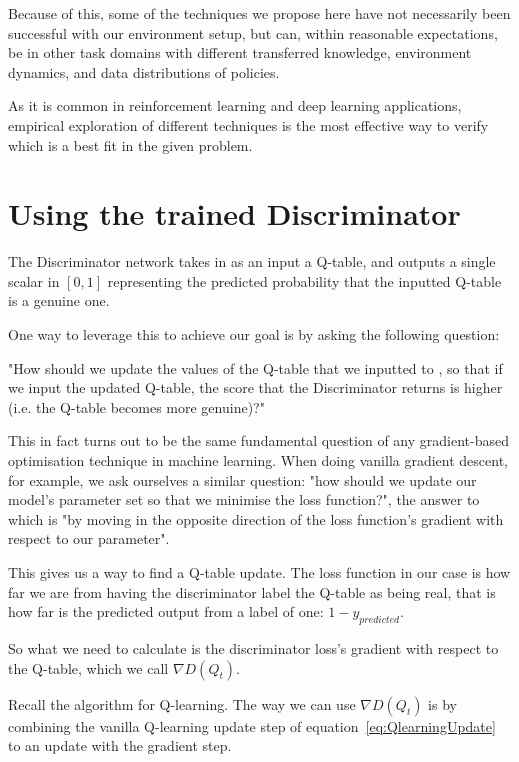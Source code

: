 Because of this, some of the techniques we propose here have not necessarily been successful with our environment setup, but can, within reasonable expectations, be in other task domains with different transferred knowledge, environment dynamics, and data distributions of policies.

As it is common in reinforcement learning and deep learning applications, empirical exploration of different techniques is the most effective way to verify which is a best fit in the given problem.

\section{Using the trained Discriminator}
The Discriminator network  takes in as an input a Q-table, and outputs a single scalar in $[0,1]$ representing the predicted probability that the inputted Q-table is a genuine one.

One way to leverage this to achieve our goal is by asking the following question:\\

\begin{addmargin}[2.5em]{2.5em}
"How should we update the values of the Q-table that we inputted to , so that if we input the updated Q-table, the score that the Discriminator returns is higher (i.e. the Q-table becomes more genuine)?"\\
\end{addmargin}

This in fact turns out to be the same fundamental question of any gradient-based optimisation technique in machine learning. When doing vanilla gradient descent, for example, we ask ourselves a similar question: "how should we update our model's parameter set so that we minimise the loss function?", the answer to which is "by moving in the opposite direction of the loss function's gradient with respect to our parameter".

This gives us a way to find a Q-table update. The loss function in our case is how far we are from having the discriminator label the Q-table as being real, that is how far is the predicted output from a label of one: $1 - y_{predicted}$.

So what we need to calculate is the discriminator loss's gradient with respect to the Q-table, which we call $\nabla D(Q_{t})$.

Recall the algorithm for Q-learning. The way we can use $\nabla D(Q_{t})$ is by combining the vanilla Q-learning update step of equation~\ref{eq:QlearningUpdate} to an update with the gradient step.

